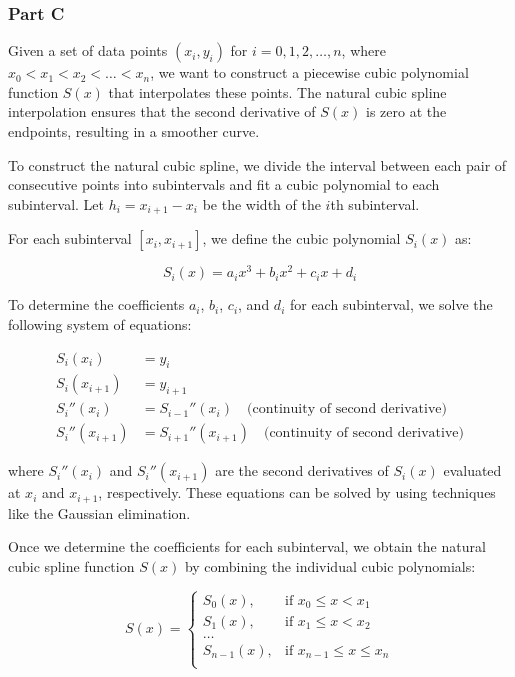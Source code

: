 \documentclass[12pt, a4paper]{article}
\numberwithin{equation}{section}
\begin{document}
\subsubsection{Part C}
Given a set of data points $(x_i, y_i)$ for $i = 0, 1, 2, \ldots, n$, where $x_0 < x_1 < x_2 < \ldots < x_n$, we want to construct a piecewise cubic polynomial function $S(x)$ that interpolates these points. The natural cubic spline interpolation ensures that the second derivative of $S(x)$ is zero at the endpoints, resulting in a smoother curve.

To construct the natural cubic spline, we divide the interval between each pair of consecutive points into subintervals and fit a cubic polynomial to each subinterval. Let $h_i = x_{i+1} - x_i$ be the width of the $i$th subinterval.

For each subinterval $[x_i, x_{i+1}]$, we define the cubic polynomial $S_i(x)$ as:

\[
S_i(x) = a_ix^3 + b_ix^2 + c_ix + d_i
\]

To determine the coefficients $a_i$, $b_i$, $c_i$, and $d_i$ for each subinterval, we solve the following system of equations:

\begin{align*}
S_i(x_i) &= y_i \\
S_i(x_{i+1}) &= y_{i+1} \\
S_i''(x_i) &= S_{i-1}''(x_i) \quad \text{(continuity of second derivative)} \\
S_i''(x_{i+1}) &= S_{i+1}''(x_{i+1}) \quad \text{(continuity of second derivative)}
\end{align*}

where $S_i''(x_i)$ and $S_i''(x_{i+1})$ are the second derivatives of $S_i(x)$ evaluated at $x_i$ and $x_{i+1}$, respectively. These equations can be solved by using techniques like the Gaussian elimination.

Once we determine the coefficients for each subinterval, we obtain the natural cubic spline function $S(x)$ by combining the individual cubic polynomials:

\[
S(x) = 
\begin{cases}
S_0(x), & \text{if } x_0 \leq x < x_1 \\
S_1(x), & \text{if } x_1 \leq x < x_2 \\
\ldots \\
S_{n-1}(x), & \text{if } x_{n-1} \leq x \leq x_n \\
\end{cases}
\]
\end{document}
